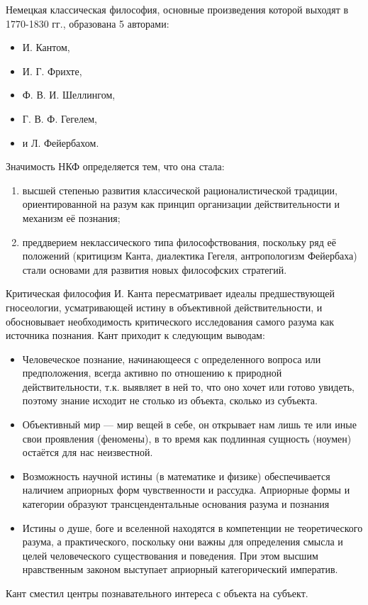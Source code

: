 
Немецкая классическая философия, основные произведения которой выходят в 1770-1830 гг., образована 5 авторами:
\begin{itemize}
    \item И. Кантом,
    \item И. Г. Фрихте,
    \item Ф. В. И. Шеллингом,
    \item Г. В. Ф. Гегелем,
    \item и Л. Фейербахом.
\end{itemize}

Значимость НКФ определяется тем, что она стала:
\begin{enumerate}
    \item высшей степенью развития классической рационалистической традиции, ориентированной на разум как принцип организации действительности и механизм её познания;
    \item преддверием неклассического типа философствования, поскольку ряд её положений (критицизм Канта, диалектика Гегеля, антропологизм Фейербаха) стали основами для развития новых философских стратегий.
\end{enumerate}

Критическая философия И. Канта пересматривает идеалы предшествующей гносеологии, усматривающей истину в объективной действительности, и обосновывает необходимость критического исследования самого разума как источника познания. Кант приходит к следующим выводам:
\begin{itemize}
    \item Человеческое познание, начинающееся с определенного вопроса или предположения, всегда активно по отношению к природной действительности, т.к. выявляет в ней то, что оно хочет или готово увидеть, поэтому знание исходит не столько из объекта, сколько из субъекта.
    \item Объективный мир --- мир вещей в себе, он открывает нам лишь те или иные свои проявления (феномены), в то время как подлинная сущность (ноумен) остаётся для нас неизвестной.
    \item Возможность научной истины (в математике и физике) обеспечивается наличием априорных форм чувственности и рассудка. Априорные формы и категории образуют трансцендентальные основания разума и познания
    \item Истины о душе, боге и вселенной находятся в компетенции не теоретического разума, а практического, поскольку они важны для определения смысла и целей человеческого существования и поведения. При этом высшим нравственным законом выступает априорный категорический императив.
\end{itemize}

Кант сместил центры познавательного интереса с объекта на субъект.